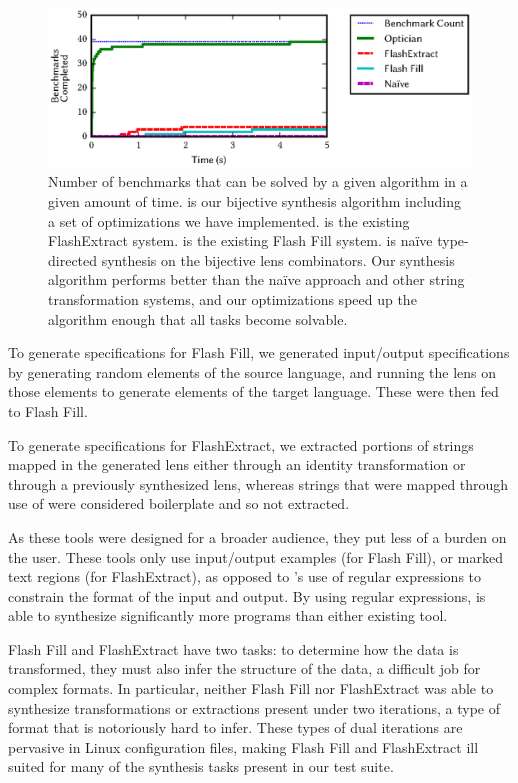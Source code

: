 \documentclass[12pt]{article}
\begin{document}
{\begin{figure}
  \includegraphics{figs/times}
  \caption{
    Number of benchmarks that can be solved by a given algorithm in a given
    amount of time.
    \Optician{} is our bijective synthesis algorithm including a set
    of optimizations we have implemented.
    \FlashExtractMode{} is the existing FlashExtract system.  \FlashFillMode{} is
    the existing Flash Fill system.  \NaiveMode{} is na\"{i}ve type-directed 
    synthesis on the bijective lens combinators.  Our synthesis algorithm performs
    better than the na\"{i}ve approach and other string transformation systems,
    and our optimizations speed up the algorithm enough that all tasks become
    solvable.
  }
  \label{fig:synthesis-times}
\end{figure}

To generate specifications for Flash Fill, we generated input/output
specifications by generating random elements of the source language, and
running the lens on those elements to generate elements of the target language.
These were then fed to Flash Fill.

To generate specifications for FlashExtract, we extracted portions of strings
mapped in the generated lens either through an identity
transformation or through a previously synthesized lens, whereas strings that were
mapped through use of \ConstLens{} were considered boilerplate and so not
extracted.

As these tools were designed for a broader audience, they put less of a burden
on the user.  These tools only use input/output examples (for Flash
Fill), or marked text regions (for FlashExtract), as opposed
to \Optician{}'s use of regular expressions to constrain the format of
the input and output.  By using regular expressions,
\Optician{} is able to synthesize significantly more programs
than either existing tool.

Flash Fill and FlashExtract have two tasks: to determine how
the data is transformed, they must also infer the structure of the data, a
difficult job for complex formats.
In particular, neither Flash Fill nor FlashExtract was able to synthesize
transformations or extractions present under two iterations, a type of format
that is notoriously hard to infer.
These types of dual iterations are pervasive in Linux configuration
files, making Flash Fill and FlashExtract ill suited for many of the synthesis
tasks present in our test suite.

}
\end{document}
